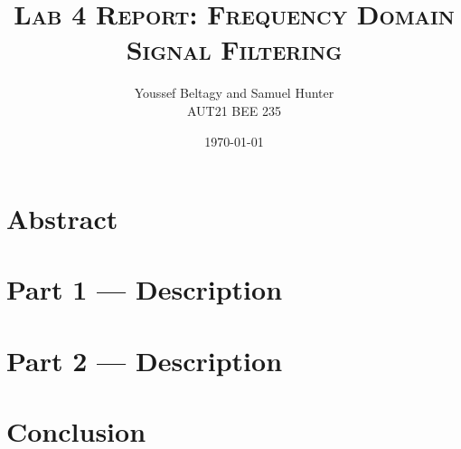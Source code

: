 \documentclass[11pt]{article}
\title{
    \textsc{Lab 4 Report: Frequency Domain Signal Filtering}
}
\author{
    \Large{Youssef Beltagy and Samuel Hunter} \\
    \large \textsc{AUT21 BEE 235}
}
\date{\today}
\begin{document}
\maketitle %
\pagebreak


\section{Abstract}

\section{Part 1 --- Description}

\pagebreak
\section{Part 2 --- Description}

\section{Conclusion}
\end{document}
